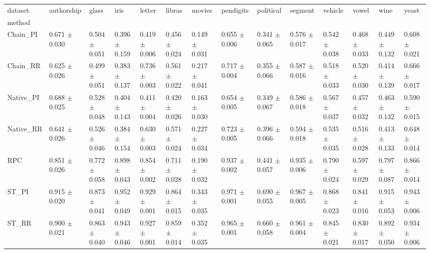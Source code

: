 \begin{tabular}{llllllllllllll}
\toprule
dataset &           authorship &                glass &                 iris &               letter &               libras &               movies &            pendigits &            political &              segment &              vehicle &                vowel &                 wine &                yeast \\
method    &                      &                      &                      &                      &                      &                      &                      &                      &                      &                      &                      &                      &                      \\
\midrule
Chain_PI  &  0.671 $ \pm $ 0.030 &  0.504 $ \pm $ 0.051 &  0.396 $ \pm $ 0.159 &  0.419 $ \pm $ 0.006 &  0.456 $ \pm $ 0.024 &  0.149 $ \pm $ 0.031 &  0.655 $ \pm $ 0.006 &  0.341 $ \pm $ 0.065 &  0.576 $ \pm $ 0.017 &  0.542 $ \pm $ 0.038 &  0.468 $ \pm $ 0.033 &  0.449 $ \pm $ 0.132 &  0.608 $ \pm $ 0.021 \\
Chain_RR  &  0.625 $ \pm $ 0.026 &  0.499 $ \pm $ 0.051 &  0.383 $ \pm $ 0.137 &  0.736 $ \pm $ 0.003 &  0.561 $ \pm $ 0.022 &  0.217 $ \pm $ 0.041 &  0.717 $ \pm $ 0.004 &  0.355 $ \pm $ 0.066 &  0.587 $ \pm $ 0.016 &  0.518 $ \pm $ 0.033 &  0.520 $ \pm $ 0.030 &  0.414 $ \pm $ 0.139 &  0.666 $ \pm $ 0.017 \\
Native_PI &  0.688 $ \pm $ 0.025 &  0.528 $ \pm $ 0.048 &  0.404 $ \pm $ 0.143 &  0.411 $ \pm $ 0.004 &  0.420 $ \pm $ 0.026 &  0.163 $ \pm $ 0.030 &  0.654 $ \pm $ 0.005 &  0.349 $ \pm $ 0.067 &  0.586 $ \pm $ 0.018 &  0.567 $ \pm $ 0.037 &  0.457 $ \pm $ 0.032 &  0.463 $ \pm $ 0.132 &  0.590 $ \pm $ 0.015 \\
Native_RR &  0.641 $ \pm $ 0.026 &  0.526 $ \pm $ 0.046 &  0.384 $ \pm $ 0.154 &  0.630 $ \pm $ 0.003 &  0.571 $ \pm $ 0.024 &  0.227 $ \pm $ 0.034 &  0.723 $ \pm $ 0.005 &  0.396 $ \pm $ 0.066 &  0.594 $ \pm $ 0.018 &  0.535 $ \pm $ 0.035 &  0.516 $ \pm $ 0.028 &  0.413 $ \pm $ 0.133 &  0.648 $ \pm $ 0.014 \\
RPC       &  0.851 $ \pm $ 0.026 &  0.772 $ \pm $ 0.058 &  0.898 $ \pm $ 0.043 &  0.854 $ \pm $ 0.002 &  0.711 $ \pm $ 0.028 &  0.190 $ \pm $ 0.032 &  0.937 $ \pm $ 0.002 &  0.441 $ \pm $ 0.057 &  0.935 $ \pm $ 0.006 &  0.790 $ \pm $ 0.024 &  0.597 $ \pm $ 0.029 &  0.797 $ \pm $ 0.087 &  0.866 $ \pm $ 0.014 \\
ST_PI     &  0.915 $ \pm $ 0.020 &  0.873 $ \pm $ 0.041 &  0.952 $ \pm $ 0.049 &  0.929 $ \pm $ 0.001 &  0.864 $ \pm $ 0.015 &  0.343 $ \pm $ 0.035 &  0.971 $ \pm $ 0.001 &  0.690 $ \pm $ 0.055 &  0.967 $ \pm $ 0.005 &  0.868 $ \pm $ 0.023 &  0.841 $ \pm $ 0.016 &  0.915 $ \pm $ 0.053 &  0.943 $ \pm $ 0.006 \\
ST_RR     &  0.900 $ \pm $ 0.021 &  0.863 $ \pm $ 0.040 &  0.943 $ \pm $ 0.046 &  0.927 $ \pm $ 0.001 &  0.859 $ \pm $ 0.014 &  0.352 $ \pm $ 0.035 &  0.965 $ \pm $ 0.001 &  0.660 $ \pm $ 0.058 &  0.961 $ \pm $ 0.004 &  0.845 $ \pm $ 0.021 &  0.830 $ \pm $ 0.017 &  0.892 $ \pm $ 0.050 &  0.934 $ \pm $ 0.006 \\
\bottomrule
\end{tabular}
